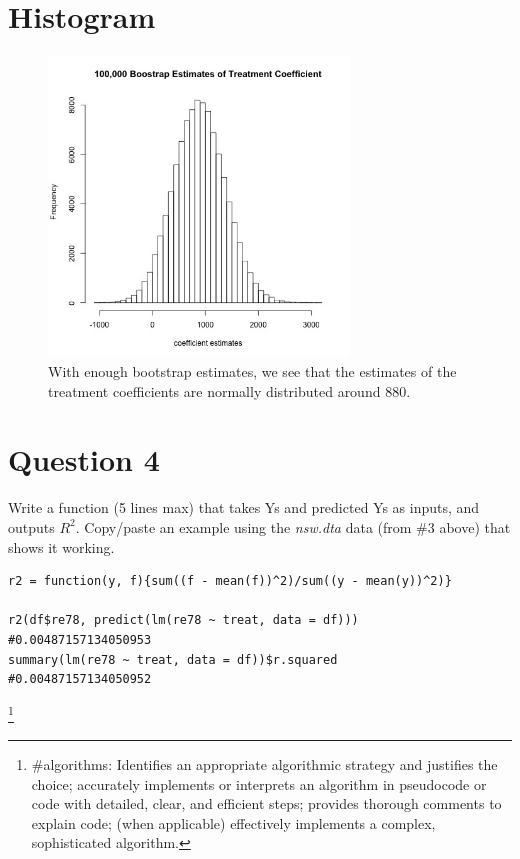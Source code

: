 \documentclass[11pt, oneside]{article}
\begin{document}
\section*{Histogram}
\begin{figure}[h]
	\includegraphics[width = 8cm, height = 8cm]{coefestimates.jpg}
	\caption{With enough bootstrap estimates, we see that the estimates of the treatment coefficients are normally distributed around 880.}
\end{figure}

\section*{Question 4}
Write a function (5 lines max) that takes Ys and predicted Ys as inputs, and outputs $R^2$. Copy/paste an example using the \textit{nsw.dta} data (from \#3 above) that shows it working.
\begin{verbatim}
r2 = function(y, f){sum((f - mean(f))^2)/sum((y - mean(y))^2)}

r2(df$re78, predict(lm(re78 ~ treat, data = df)))	 #0.00487157134050953
summary(lm(re78 ~ treat, data = df))$r.squared		    #0.00487157134050952
\end{verbatim}\footnote{\#algorithms: Identifies an appropriate algorithmic strategy and justifies the choice; accurately implements or interprets an algorithm in pseudocode or code with detailed, clear, and efficient steps; provides thorough comments to explain code; (when applicable) effectively implements a complex, sophisticated algorithm. }

\newpage
\end{document}
